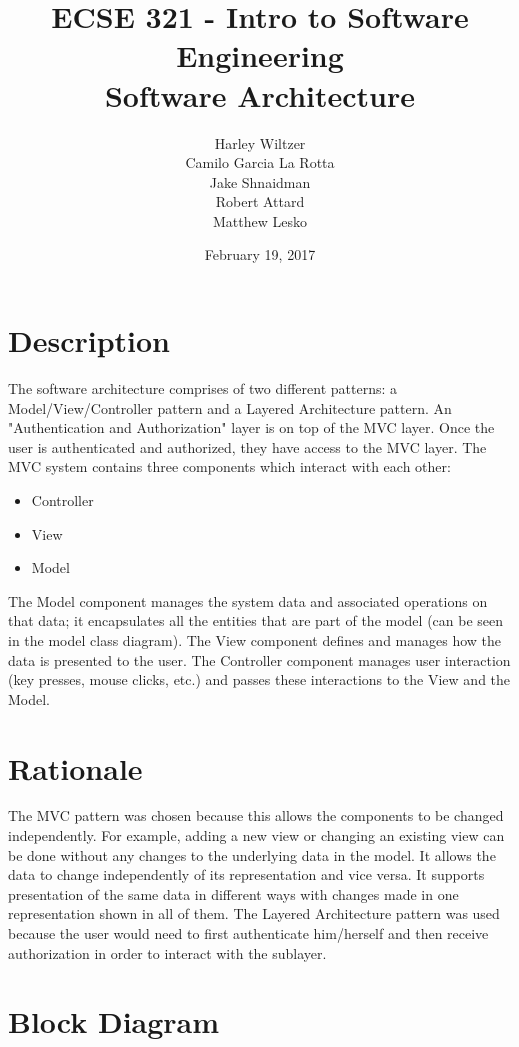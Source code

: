 \documentclass[12pt]{article}
\title{ECSE 321 - Intro to Software Engineering\\Software Architecture}
\author{Harley Wiltzer\\Camilo Garcia La Rotta\\Jake Shnaidman\\Robert Attard\\Matthew Lesko}
\date{February 19, 2017}
\begin{document}
\maketitle
\newpage
{} %
\tableofcontents
\section{Description}
	The software architecture comprises of two different patterns: a Model/View/Controller pattern and a Layered Architecture pattern. An "Authentication and Authorization" layer is on top of the MVC layer. Once the user is authenticated and authorized, they have access to the MVC layer. The MVC system contains three components which interact with each other: 
	\begin{itemize}
		\item Controller
		\item View
		\item Model
	\end{itemize}
	The Model component manages the system data and associated operations on that data; it encapsulates all the entities that are part of the model (can be seen in the model class diagram). The View component defines and manages how the data is presented to the user. The Controller component manages user interaction (key presses, mouse clicks, etc.) and passes these interactions to the View and the Model.
\section{Rationale}
	The MVC pattern was chosen because this allows the components to be changed independently. For example, adding a new view or changing an existing view can be done without any changes to the underlying data in the model. It allows the data to change independently of its representation and vice versa. It supports presentation of the same data in different ways with changes made in one representation shown in all of them. 
	The Layered Architecture pattern was used because the user would need to first authenticate him/herself and then receive authorization in order to interact with the sublayer.
\section{Block Diagram}

\end{document}
